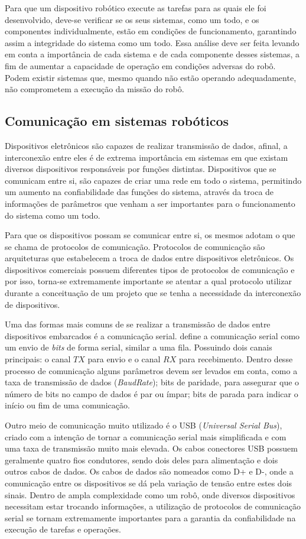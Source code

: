 Para que um dispositivo robótico execute as tarefas para as quais ele foi desenvolvido, deve-se verificar se os seus sistemas, como um todo, e os componentes individualmente, estão em condições de funcionamento, garantindo assim a integridade do sistema como um todo. Essa análise deve ser feita levando em conta a importância de cada sistema e de cada componente desses sistemas, a fim de aumentar a capacidade de operação em condições adversas do robô. Podem existir sistemas que, mesmo quando não estão operando adequadamente, não comprometem a execução da missão do robô.

\subsection{Comunicação em sistemas robóticos}\label{sec:comm_sis}
Dispositivos eletrônicos são capazes de realizar transmissão de dados, afinal, a interconexão entre eles é de extrema importância em sistemas em que existam diversos dispositivos responsáveis por funções distintas. Dispositivos que se comunicam entre si, são capazes de criar uma rede em todo o sistema, permitindo um aumento na confiabilidade das funções do sistema, através da troca de informações de parâmetros que venham a ser importantes para o funcionamento do sistema como um todo.

Para que os dispositivos possam se comunicar entre si, os mesmos adotam o que se chama de protocolos de comunicação. Protocolos de comunicação são arquiteturas que estabelecem a troca de dados entre dispositivos eletrônicos. Os dispositivos comerciais possuem diferentes tipos de protocolos de comunicação e por isso, torna-se extremamente importante se atentar a qual protocolo utilizar durante a conceituação de um projeto que se tenha a necessidade da interconexão de dispositivos.

Uma das formas mais comuns de se realizar a transmissão de dados entre dispositivos embarcados é a comunicação serial. \cite{livro_sistemas_embarcados} define a comunicação serial como um envio de \textit{bits} de forma serial, similar a uma fila. Possuindo dois canais principais: o canal $TX$ para envio e o canal $RX$ para recebimento. Dentro desse processo de comunicação alguns parâmetros devem ser levados em conta, como a taxa de transmissão de dados (\textit{BaudRate}); bits de paridade, para assegurar que o número de bits no campo de dados é par ou ímpar; bits de parada para indicar o início ou fim de uma comunicação.

Outro meio de comunicação muito utilizado é o USB (\textit{Universal Serial Bus}), criado com a intenção de tornar a comunicação serial mais simplificada e com uma taxa de transmissão muito mais elevada. Os cabos conectores USB possuem geralmente quatro fios condutores, sendo dois deles para alimentação e dois outros cabos de dados. Os cabos de dados são nomeados como D+ e D-, onde a comunicação entre os dispositivos se dá pela variação de tensão entre estes dois sinais.
Dentro de ampla complexidade como um robô, onde diversos dispositivos necessitam estar trocando informações, a utilização de protocolos de comunicação serial se tornam extremamente importantes para a garantia da confiabilidade na execução de tarefas e operações.
